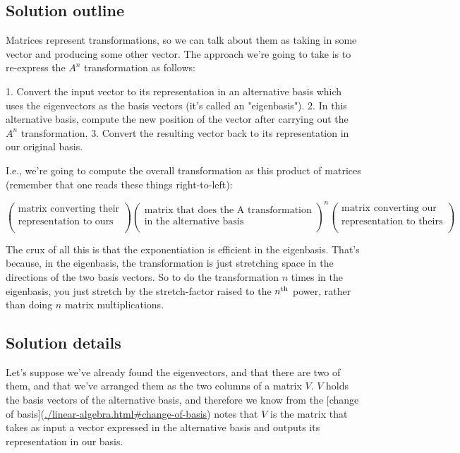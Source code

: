 \subsection*{Solution outline}

Matrices represent transformations, so we can talk about them as taking in some
vector and producing some other vector. The approach we're going to take is to
re-express the $A^n$ transformation as follows:

1. Convert the input vector to its representation in an alternative basis which
   uses the eigenvectors as the basis vectors (it's called an "eigenbasis").
2. In this alternative basis, compute the new position of the vector after
   carrying out the $A^n$ transformation.
3. Convert the resulting vector back to its representation in our original
   basis.

I.e., we're going to compute the overall transformation as this product of
matrices (remember that one reads these things right-to-left):

$$
\begin{pmatrix}\text{matrix converting their}\\\text{representation to ours} \\ \end{pmatrix}
\begin{pmatrix}\text{matrix that does the A transformation}\\\text{in the alternative basis} \\ \end{pmatrix}^n
\begin{pmatrix}\text{matrix converting our}\\\text{representation to theirs} \\ \end{pmatrix}
$$

The crux of all this is that the exponentiation is efficient in the
eigenbasis. That's because, in the eigenbasis, the transformation is just
stretching space in the directions of the two basis vectors. So to do the
transformation $n$ times in the eigenbasis, you just stretch by the
stretch-factor raised to the $n^{\text{th}}$ power, rather than doing $n$ matrix
multiplications.

\subsection*{Solution details}

Let's suppose we've already found the eigenvectors, and that there are two of
them, and that we've arranged them as the two columns of a matrix $V$. $V$ holds
the basis vectors of the alternative basis, and therefore we know from the
[change of basis](\url{./linear-algebra.html#change-of-basis}) notes that $V$ is the
matrix that takes as input a vector expressed in the alternative basis and
outputs its representation in our basis.

